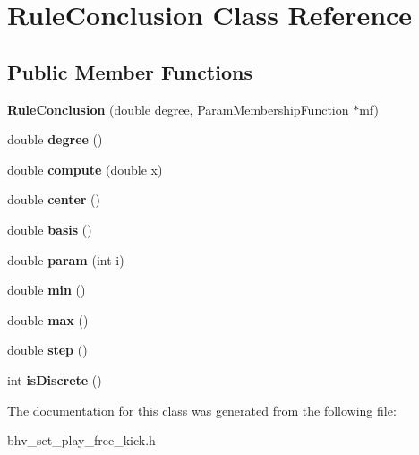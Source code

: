 \hypertarget{classRuleConclusion}{
\section{RuleConclusion Class Reference}
\label{classRuleConclusion}
}
\subsection*{Public Member Functions}
\begin{DoxyCompactItemize}
\item 
\hypertarget{classRuleConclusion_a5b13ebcac7a2be7131350e8e2718566c}{
{\bfseries RuleConclusion} (double degree, \hyperlink{classParamMembershipFunction}{ParamMembershipFunction} $\ast$mf)}
\label{classRuleConclusion_a5b13ebcac7a2be7131350e8e2718566c}

\item 
\hypertarget{classRuleConclusion_a9375f2c63edbc834fbea011e14ed6b70}{
double {\bfseries degree} ()}
\label{classRuleConclusion_a9375f2c63edbc834fbea011e14ed6b70}

\item 
\hypertarget{classRuleConclusion_a496ce87991cda4a37493b0e8add98f97}{
double {\bfseries compute} (double x)}
\label{classRuleConclusion_a496ce87991cda4a37493b0e8add98f97}

\item 
\hypertarget{classRuleConclusion_a4472f9d125b8e292824457ae357d90cc}{
double {\bfseries center} ()}
\label{classRuleConclusion_a4472f9d125b8e292824457ae357d90cc}

\item 
\hypertarget{classRuleConclusion_a9a05bd750e49193bca302684e93ef9de}{
double {\bfseries basis} ()}
\label{classRuleConclusion_a9a05bd750e49193bca302684e93ef9de}

\item 
\hypertarget{classRuleConclusion_ab12a18eed58a2bba87edf044c7aa3a73}{
double {\bfseries param} (int i)}
\label{classRuleConclusion_ab12a18eed58a2bba87edf044c7aa3a73}

\item 
\hypertarget{classRuleConclusion_ab2a7535ac51f75612fced7123669d3b4}{
double {\bfseries min} ()}
\label{classRuleConclusion_ab2a7535ac51f75612fced7123669d3b4}

\item 
\hypertarget{classRuleConclusion_aa9305dbead2f00505f8cb188a0bf887f}{
double {\bfseries max} ()}
\label{classRuleConclusion_aa9305dbead2f00505f8cb188a0bf887f}

\item 
\hypertarget{classRuleConclusion_aa865bf3ba5d8267921ed32e6d5c555d1}{
double {\bfseries step} ()}
\label{classRuleConclusion_aa865bf3ba5d8267921ed32e6d5c555d1}

\item 
\hypertarget{classRuleConclusion_acd311e3f4ee3d2803391be760098d395}{
int {\bfseries isDiscrete} ()}
\label{classRuleConclusion_acd311e3f4ee3d2803391be760098d395}

\end{DoxyCompactItemize}


The documentation for this class was generated from the following file:\begin{DoxyCompactItemize}
\item 
bhv\_\-set\_\-play\_\-free\_\-kick.h\end{DoxyCompactItemize}
